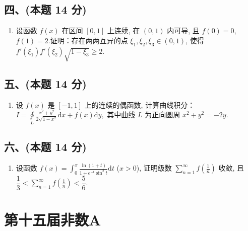 \subsection*{四、(本题 14 分)}
\begin{enumerate}[start=8]
    \item 设函数 $f(x)$ 在区间 $[0, 1]$ 上连续, 在 $(0, 1)$ 内可导, 且 $f(0) = 0$, $f(1) = 2$.证明：存在两两互异的点 $\xi_1,  \xi_2,  \xi_3 \in (0, 1)$, 使得 $f'(\xi_1)f'(\xi_2)\sqrt{1-\xi_3} \geq 2$.
\end{enumerate}

\subsection*{五、(本题 14 分)}
\begin{enumerate}[start=9]
    \item 设 $f(x)$ 是 $[-1, 1]$ 上的连续的偶函数, 计算曲线积分：
          $ I = \displaystyle\oint\limits_{L} \frac{x^2 + y^2}{2\sqrt{1-x^2}} \mathrm{d}x + f(x) \mathrm{d}y,  $
          其中曲线 $L$ 为正向圆周 $x^2 + y^2 = -2y$.
\end{enumerate}

\subsection*{六、(本题 14 分)}
\begin{enumerate}[start=10]
    \item 设函数 $f(x) = \displaystyle\int_{0}^{x} \frac{\ln(1+t)}{1+e^{-t} \sin^3 t} \mathrm{d}t$ ($x > 0$), 证明级数
          $ \displaystyle\sum_{n=1}^{\infty} f\left(\frac{1}{n}\right) $
          收敛, 且
          $ \dfrac{1}{3} < \displaystyle\sum_{n=1}^{\infty} f\left(\frac{1}{n}\right) < \dfrac{5}{6}. $
\end{enumerate}


\newpage
\section{第十五届非数A}

